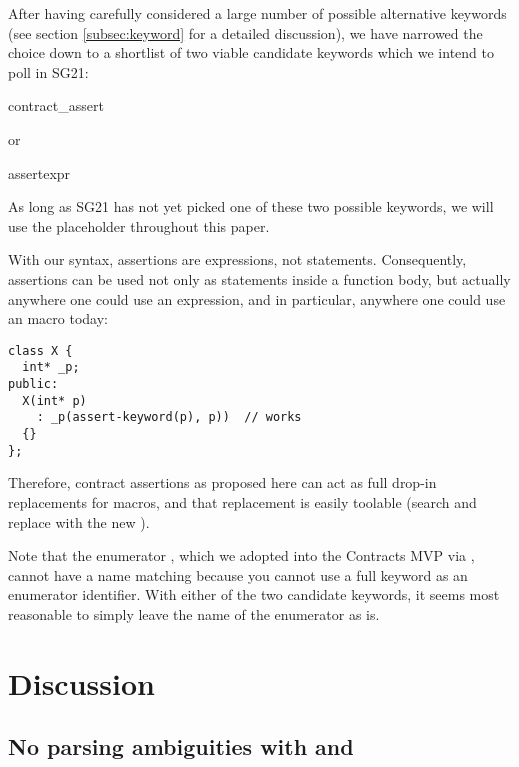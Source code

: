 After having carefully considered a large number of possible alternative keywords (see section \ref{subsec:keyword} for a detailed discussion), we have narrowed the choice down to a shortlist of two viable candidate keywords which we intend to poll in SG21:

\begin{codeblock}
contract_assert
\end{codeblock}

or

\begin{codeblock}
assertexpr
\end{codeblock}

As long as SG21 has not yet picked one of these two possible keywords, we will use the placeholder \emph{} throughout this paper.

With our syntax, assertions are expressions, not statements. Consequently, assertions can be used not only as statements inside a function body, but actually anywhere one could use an expression, and in particular, anywhere one could use an  macro today:

\begin{lstlisting}
class X {
  int* _p;
public:
  X(int* p)
    : _p(assert-keyword(p), p))  // works
  {}
};
\end{lstlisting}

Therefore, contract assertions as proposed here can act as full drop-in replacements for  macros, and that replacement is easily toolable (search and replace  with the new \emph{}).

Note that the enumerator \mbox{}, which we adopted into the Contracts MVP via \cite{P2811R7}, cannot have a name matching \emph{} because you cannot use a full keyword as an enumerator identifier. With either of the two candidate keywords, it seems most reasonable to simply leave the name of the enumerator as is.

\section{Discussion}

\subsection{No parsing ambiguities with  and }
\label{subsec:noambig}

